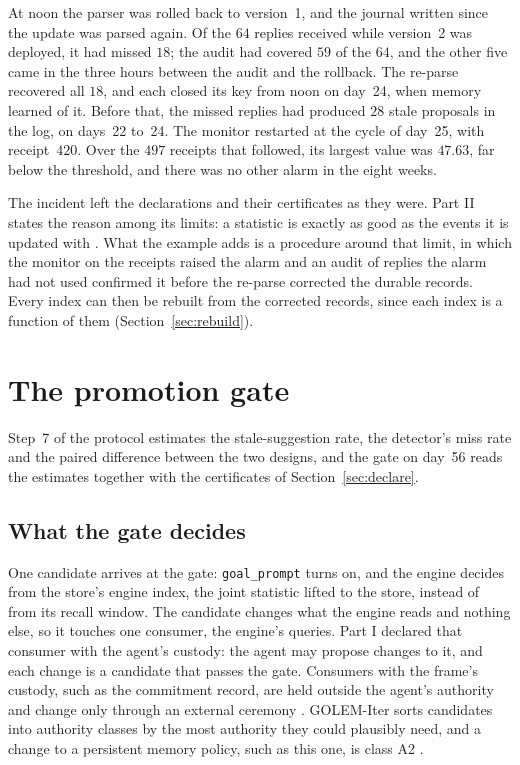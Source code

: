 \documentclass[11pt]{article}
\newcommand{\code}[1]{\texttt{#1}}
\theoremstyle{definition}
\theoremstyle{plain}
\begin{document}
At noon the parser was rolled back to version~1, and the journal written since the update was
parsed again. Of the $64$ replies received while version~2 was deployed, it had missed $18$; the
audit had covered $59$ of the $64$, and the other five came in the three hours between the audit
and the rollback. The re-parse recovered all $18$, and each closed its key from noon on day~24, when
memory learned of it. Before that, the missed replies had produced $28$ stale proposals in the log,
on days~22 to~24. The monitor restarted at the cycle of day~25, with receipt~$420$. Over the $497$
receipts that followed, its largest value was $47.63$, far below the threshold, and there was no
other alarm in the eight weeks.

The incident left the declarations and their certificates as they were. Part II states the reason
among its limits: a statistic is exactly as good as the events it is updated with
\cite[Section~10]{part2}. What the example adds is a procedure around that limit, in which the
monitor on the receipts raised the alarm and an audit of replies the alarm had not used confirmed
it before the re-parse corrected the durable records. Every index can then be rebuilt from the
corrected records, since each index is a function of them (Section~\ref{sec:rebuild}).
\section{The promotion gate}\label{sec:gate}

Step~7 of the protocol estimates the stale-suggestion rate, the detector's miss rate and the paired
difference between the two designs, and the gate on day~56 reads the estimates together with the
certificates of Section~\ref{sec:declare}.

\subsection{What the gate decides}\label{sec:what}

One candidate arrives at the gate: \code{goal\_prompt} turns on, and the engine decides from the
store's engine index, the joint statistic lifted to the store, instead of from its recall window.
The candidate changes what the engine reads and nothing else, so it touches one consumer, the
engine's queries. Part I declared that consumer with the agent's custody: the agent may propose
changes to it, and each change is a candidate that passes the gate. Consumers with the frame's
custody, such as the commitment record, are held outside the agent's authority and change only
through an external ceremony \cite[Section~3.5]{part1}. GOLEM-Iter sorts candidates into authority
classes by the most authority they could plausibly need, and a change to a persistent memory
policy, such as this one, is class A2 \cite[Section~2.3]{part1}.
\end{document}
